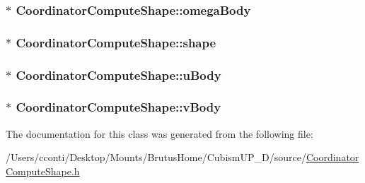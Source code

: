 \subsubsection[{omega\+Body}]{ $\ast$ Coordinator\+Compute\+Shape\+::omega\+Body\hspace{0.3cm}{\ttfamily [protected]}}\label{class_coordinator_compute_shape_ad8fc7ad631324607d5d887d7c79ae0b7}
\hypertarget{class_coordinator_compute_shape_a0a772cc3cb7014cdf9f271b3b4792a3c}{}
\subsubsection[{shape}]{$\ast$ Coordinator\+Compute\+Shape\+::shape\hspace{0.3cm}{\ttfamily [protected]}}\label{class_coordinator_compute_shape_a0a772cc3cb7014cdf9f271b3b4792a3c}
\hypertarget{class_coordinator_compute_shape_adc09b276b152cb1efd9ce1af98f7642a}{}
\subsubsection[{u\+Body}]{$\ast$ Coordinator\+Compute\+Shape\+::u\+Body\hspace{0.3cm}{\ttfamily [protected]}}\label{class_coordinator_compute_shape_adc09b276b152cb1efd9ce1af98f7642a}
\hypertarget{class_coordinator_compute_shape_ae4f0f03770ea60b05034bd0a1fdddf45}{}
\subsubsection[{v\+Body}]{ $\ast$ Coordinator\+Compute\+Shape\+::v\+Body\hspace{0.3cm}{\ttfamily [protected]}}\label{class_coordinator_compute_shape_ae4f0f03770ea60b05034bd0a1fdddf45}


The documentation for this class was generated from the following file\+:\begin{DoxyCompactItemize}
\item 
/\+Users/cconti/\+Desktop/\+Mounts/\+Brutus\+Home/\+Cubism\+U\+P\+\_\+D/source/\hyperlink{_coordinator_compute_shape_8h}{Coordinator\+Compute\+Shape.\+h}\end{DoxyCompactItemize}

